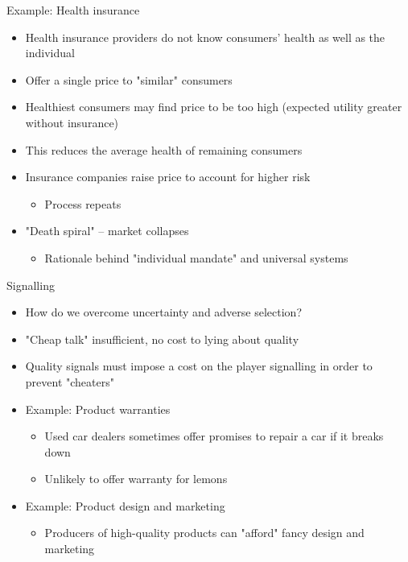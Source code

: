 \documentclass[10pt]{beamer}
\begin{document}
\begin{frame}[label={sec:org994f94a}]{}
\alert{Example: Health insurance}
\begin{itemize}
\item Health insurance providers do not know consumers' health as well as the individual
\item Offer a single price to "similar" consumers
\item Healthiest consumers may find price to be too high (expected utility greater without insurance)
\item This reduces the average health of remaining consumers
\item Insurance companies raise price to account for higher risk
\begin{itemize}
\item Process repeats
\end{itemize}
\item "Death spiral" -- market collapses
\begin{itemize}
\item Rationale behind "individual mandate" and universal systems
\end{itemize}
\end{itemize}
\end{frame}

\begin{frame}[label={sec:orgc98faaf}]{}
\alert{Signalling}
\begin{itemize}
\item How do we overcome uncertainty and adverse selection?
\item "Cheap talk" insufficient, no cost to lying about quality
\item Quality signals must impose a cost on the player signalling in order to prevent "cheaters"
\item Example: Product warranties
\begin{itemize}
\item Used car dealers sometimes offer promises to repair a car if it breaks down
\item Unlikely to offer warranty for lemons
\end{itemize}
\item Example: Product design and marketing
\begin{itemize}
\item Producers of high-quality products can "afford" fancy design and marketing
\end{itemize}
\end{itemize}
\end{frame}
\end{document}
